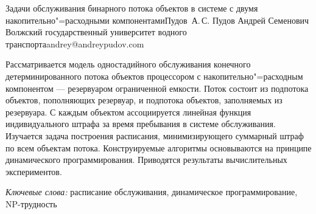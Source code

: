 \begin{ptkarticle}%
{Задачи обслуживания бинарного потока объектов в системе с двумя накопительно"=расходными компонентами}{Пудов~А.\,С.}
\OneAuthor%
{Пудов Андрей Семенович}%
    {Волжский государственный университет водного транспорта}{andrey@andreypudov.com}%

Рассматривается модель одностадийного обслуживания конечного детерминированного потока объектов процессором с накопительно"=расходным компонентом --- резервуаром ограниченной емкости. Поток состоит из подпотока объектов, пополняющих резервуар, и подпотока объектов, заполняемых из резервуара. С каждым объектом ассоциируется линейная функция индивидуального штрафа за время пребывания в системе обслуживания. Изучается задача построения расписания, минимизирующего суммарный штраф по всем объектам потока. Конструируемые алгоритмы основываются на принципе динамического программирования. Приводятся результаты вычислительных экспериментов.

{\itshape Ключевые слова:} расписание обслуживания, динамическое программирование, NP-трудность






\end{ptkarticle}
